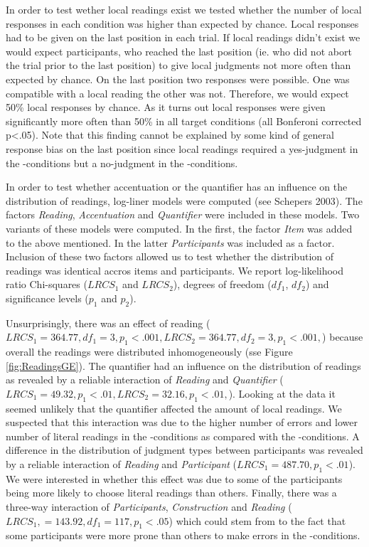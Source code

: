 \documentclass[fleqn,reqno,10pt,draft]{article}
\newcommand{\as}{\acro{as}}
\renewcommand{\es}{\acro{es}}
\begin{document}
In order to test wether local readings exist we tested whether the
number of local responses in each condition was higher than expected
by chance. Local responses had to be given on the last position in
each trial. If local readings didn't exist we would expect
participants, who reached the last position (ie. who did not abort the
trial prior to the last position) to give local judgments not more
often than expected by chance. On the last position two responses were
possible. One was compatible with a local reading the other was
not. Therefore, we would expect 50\% local responses by chance. As it
turns out local responses were given significantly more often than
50\% in all target conditions (all Bonferoni corrected p<.05). Note
that this finding cannot be explained by some kind of general response
bias on the last position since local readings required a yes-judgment
in the \es-conditions but a no-judgment in the \as-conditions.

In order to test whether accentuation or the quantifier has an
influence on the distribution of readings, log-liner models were
computed (see Schepers 2003). The factors {\it Reading}, {\it
  Accentuation} and {\it Quantifier} were included in these
models. Two variants of these models were computed.  In the first, the
factor {\it Item} was added to the above mentioned. In the latter {\it
  Participants} was included as a factor. Inclusion of these two
factors allowed us to test whether the distribution of readings was
identical accros items and participants. We report log-likelihood
ratio Chi-squares ($LRCS_1$ and $LRCS_2$), degrees of freedom ($df_1$,
$df_2$) and significance levels ($p_1$ and $p_2$).

Unsurprisingly, there was an effect of reading ($LRCS_1=364.77, df_1 =
3, p_1<.001, LRCS_2=364.77, df_2 = 3, p_1<.001,$) because overall the
readings were distributed inhomogeneously (sse Figure
\ref{fig:ReadingsGE}). The quantifier had an influence on the
distribution of readings as revealed by a reliable interaction of {\it
  Reading} and {\it Quantifier} ($LRCS_1=49.32, p_1<.01,LRCS_2=32.16,
p_1<.01,$). Looking at the data it seemed unlikely that the quantifier
affected the amount of local readings. We suspected that this
interaction was due to the higher number of errors and lower number of
literal readings in the \es-conditions as compared with
the \as-conditions. A difference in the distribution of judgment
types between participants was revealed by a reliable interaction of
{\it Reading} and {\it Participant} ($LRCS_1=487.70, p_1<.01$). We
were interested in whether this effect was due to some of the
participants being more likely to choose literal readings than
others. Finally, there was a three-way interaction of {\it
  Participants}, {\it Construction} and {\it Reading} ($LRCS_1, =
143.92, df_1 = 117, p_1<.05$) which could stem from to the fact that
some participants were more prone than others to make errors in the
\es-conditions.
\end{document}
